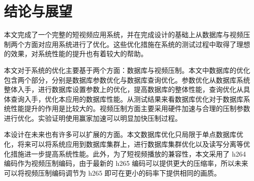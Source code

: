 \chapter{结论与展望}\label{sec:conclusion}

本文完成了一个完整的短视频应用系统，并在完成设计的基础上从数据库与视频压制两个方面对应用系统进行了优化。这些优化措施在系统的测试过程中取得了理想的效果，对系统性能的提升也有着较大的帮助。

本文对于系统的优化主要基于两个方面：数据库与视频压制。本文中数据库的优化包含两个部分，分别是数据库参数优化与数据库查询优化。参数优化从数据库系统整体入手，进行数据库设置参数上的优化，提高数据库的整体性能，查询优化从具体查询入手，优化本应用的数据库性能。从测试结果来看数据库优化对于数据库系统性能提升的作用是比较大的。视频压制方面主要采用硬件加速与合理的压制参数进行优化。实验证明使用赢家加速可以明显加快压制过程。

本设计在未来也有许多可以扩展的方面。本文数据库优化只局限于单点数据库优化，将来可以将系统应用到数据库集群上，进行数据库集群优化以及读写分离等优化措施进一步提高系统性能。此外，为了短视频播放的兼容性，本文采用了 h264 编码作为视频压制编码，由于最新的 h265 编码可以提供更大的压缩率，所以未来可以将视频压制编码调节为 h265 即可在更小的码率下提供相同的画质。
